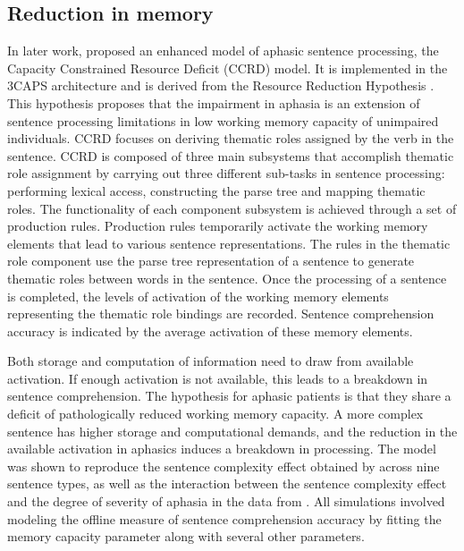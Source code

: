 \documentclass{cambridge7A}\usepackage[]{graphicx}\usepackage[]{color}
\begin{document}
\subsection{Reduction in memory}
In later work, 
\cite{Haarmann-EtAl-1997} proposed an enhanced model of aphasic sentence processing, the Capacity Constrained Resource Deficit (CCRD) model. It is implemented in the 3CAPS architecture  \cite{Just1980} and is derived from the Resource Reduction Hypothesis \cite{Miyake-EtAl-1994}. This hypothesis proposes that the impairment in aphasia is an extension of sentence processing limitations in low working memory capacity of unimpaired individuals. CCRD focuses on deriving thematic roles assigned by the verb in the sentence. CCRD is composed of three main subsystems that accomplish thematic role assignment by carrying out three different sub-tasks in sentence processing: performing lexical access, constructing the parse tree and mapping thematic roles. The functionality of each component subsystem is achieved through a set of production rules. Production rules temporarily activate the working memory elements that lead to various sentence representations. The rules in the thematic role component use the parse tree representation of a sentence to generate thematic roles between words in the sentence. Once the processing of a sentence is completed, the levels of activation of the working memory elements representing the thematic role bindings are recorded. Sentence comprehension accuracy is indicated by the average activation of these memory elements. 

Both storage and computation of information need to draw from available activation. If enough activation is not available, this leads to a breakdown in sentence comprehension. The hypothesis for aphasic patients is that they share a deficit of pathologically reduced working memory capacity. A more complex sentence has higher storage and computational demands, and the reduction in the available activation in aphasics induces a breakdown in processing. The model was shown to reproduce the sentence complexity effect obtained by \cite{Caplan-Et-Al-1985} across nine sentence types, as well as the interaction between the sentence complexity effect and the degree of severity of aphasia in the data from \cite{Kolk-vanGrunsven-1985}. All simulations involved modeling the offline measure of sentence comprehension accuracy by fitting the memory capacity parameter along with several other parameters.
\end{document}
